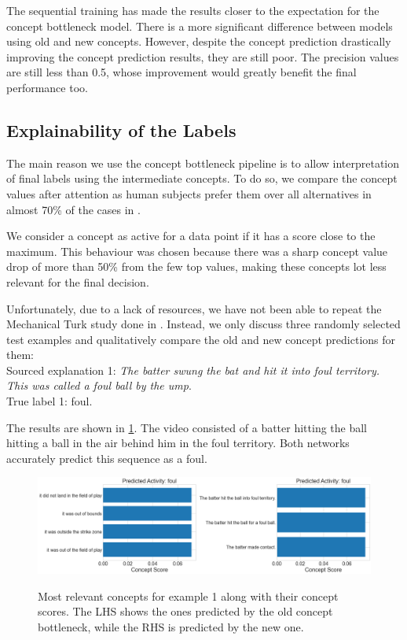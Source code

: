 The sequential training has made the results closer to the expectation for the concept bottleneck model. 
There is a more significant difference between models using old and new concepts.
However, despite the concept prediction drastically improving the concept prediction results, they are still poor.
The precision values are still less than 0.5, whose improvement would greatly benefit the final performance too.

\subsection{Explainability of the Labels}



The main reason we use the concept bottleneck pipeline is to allow interpretation of final labels using the intermediate concepts.
To do so, we compare the concept values after attention as human subjects prefer them over all alternatives in almost 70\% of the cases in \cite{RefWorks:RefID:16-2021automatic}.

We consider a concept as active for a data point if it has a score close to the maximum.
This behaviour was chosen because there was a sharp concept value drop of more than 50\% from the few top values, making these concepts lot less relevant for the final decision.


Unfortunately, due to a lack of resources, we have not been able to repeat the Mechanical Turk study done in \cite{RefWorks:RefID:16-2021automatic}. 
Instead, we only discuss three randomly selected test examples and qualitatively compare the old and new concept predictions for them: \\


Sourced explanation 1: \emph{The batter swung the bat and hit it into foul territory. This was called a foul ball by the ump}. \\
True label 1: foul.

The results are shown in \ref{concepts-results-1}.
The video consisted of a batter hitting the ball hitting a ball in the air behind him in the foul territory.
Both networks accurately predict this sequence as a foul.

\begin{figure}[h]
\caption{Most relevant concepts for example 1 along with their concept scores. The LHS shows the ones predicted by the old concept bottleneck, while the RHS is predicted by the new one.}
\centering
\includegraphics[width=\textwidth]{concept-bottleneck-pipeline/explanations_concepts1.png}
\label{concepts-results-1}
\end{figure}

